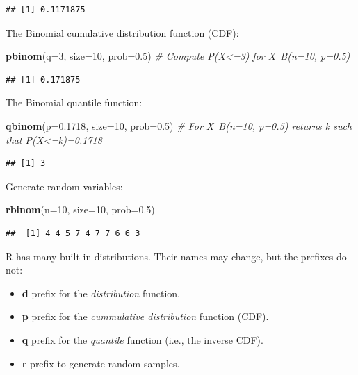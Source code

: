 \documentclass[]{book}
\newenvironment{Shaded}{\begin{snugshade}}{\end{snugshade}}
\newcommand{\CommentTok}[1]{\textcolor[rgb]{0.56,0.35,0.01}{\textit{#1}}}
\newcommand{\DataTypeTok}[1]{\textcolor[rgb]{0.13,0.29,0.53}{#1}}
\newcommand{\DecValTok}[1]{\textcolor[rgb]{0.00,0.00,0.81}{#1}}
\newcommand{\FloatTok}[1]{\textcolor[rgb]{0.00,0.00,0.81}{#1}}
\newcommand{\KeywordTok}[1]{\textcolor[rgb]{0.13,0.29,0.53}{\textbf{#1}}}
\newcommand{\NormalTok}[1]{#1}
\providecommand{\tightlist}{%
  \setlength{\itemsep}{0pt}\setlength{\parskip}{0pt}}
\theoremstyle{definition}
\theoremstyle{definition}
\theoremstyle{definition}
\theoremstyle{remark}
\begin{document}
\begin{verbatim}
## [1] 0.1171875
\end{verbatim}

The Binomial cumulative distribution function (CDF):

\begin{Shaded}
\begin{Highlighting}[]
\KeywordTok{pbinom}\NormalTok{(}\DataTypeTok{q=}\DecValTok{3}\NormalTok{, }\DataTypeTok{size=}\DecValTok{10}\NormalTok{, }\DataTypeTok{prob=}\FloatTok{0.5}\NormalTok{) }\CommentTok{# Compute P(X<=3) for X~B(n=10, p=0.5)   }
\end{Highlighting}
\end{Shaded}

\begin{verbatim}
## [1] 0.171875
\end{verbatim}

The Binomial quantile function:

\begin{Shaded}
\begin{Highlighting}[]
\KeywordTok{qbinom}\NormalTok{(}\DataTypeTok{p=}\FloatTok{0.1718}\NormalTok{, }\DataTypeTok{size=}\DecValTok{10}\NormalTok{, }\DataTypeTok{prob=}\FloatTok{0.5}\NormalTok{) }\CommentTok{# For X~B(n=10, p=0.5) returns k such that P(X<=k)=0.1718}
\end{Highlighting}
\end{Shaded}

\begin{verbatim}
## [1] 3
\end{verbatim}

Generate random variables:

\begin{Shaded}
\begin{Highlighting}[]
\KeywordTok{rbinom}\NormalTok{(}\DataTypeTok{n=}\DecValTok{10}\NormalTok{, }\DataTypeTok{size=}\DecValTok{10}\NormalTok{, }\DataTypeTok{prob=}\FloatTok{0.5}\NormalTok{)}
\end{Highlighting}
\end{Shaded}

\begin{verbatim}
##  [1] 4 4 5 7 4 7 7 6 6 3
\end{verbatim}

R has many built-in distributions.
Their names may change, but the prefixes do not:

\begin{itemize}
\tightlist
\item
  \textbf{d} prefix for the \emph{distribution} function.
\item
  \textbf{p} prefix for the \emph{cummulative distribution} function (CDF).
\item
  \textbf{q} prefix for the \emph{quantile} function (i.e., the inverse CDF).
\item
  \textbf{r} prefix to generate random samples.
\end{itemize}
\end{document}
